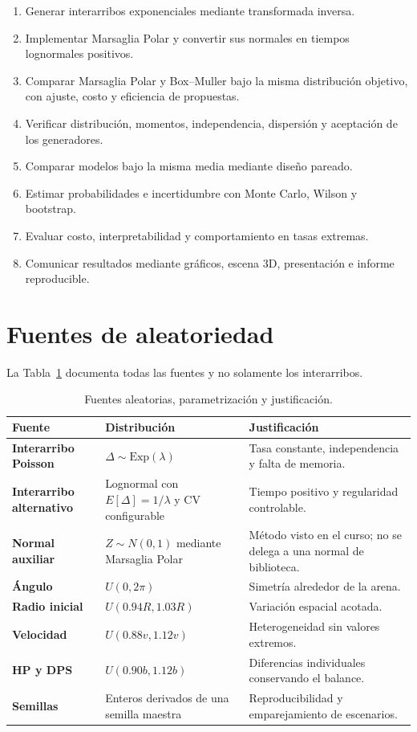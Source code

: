 \documentclass[11pt,a4paper]{article}
\begin{document}
\begin{enumerate}
  \item Generar interarribos exponenciales mediante transformada inversa.
  \item Implementar Marsaglia Polar y convertir sus normales en tiempos
        lognormales positivos.
  \item Comparar Marsaglia Polar y Box--Muller bajo la misma distribución
        objetivo, con ajuste, costo y eficiencia de propuestas.
  \item Verificar distribución, momentos, independencia, dispersión y
        aceptación de los generadores.
  \item Comparar modelos bajo la misma media mediante diseño pareado.
  \item Estimar probabilidades e incertidumbre con Monte Carlo, Wilson y
        bootstrap.
  \item Evaluar costo, interpretabilidad y comportamiento en tasas extremas.
  \item Comunicar resultados mediante gráficos, escena 3D, presentación e
        informe reproducible.
\end{enumerate}

\section{Fuentes de aleatoriedad}

La Tabla~\ref{tab:random-sources} documenta todas las fuentes y no solamente
los interarribos.

\begin{table}[H]
\centering
\small
\caption{Fuentes aleatorias, parametrización y justificación.}
\label{tab:random-sources}
\begin{tabularx}{\textwidth}{>{\bfseries}p{2.9cm}p{4.2cm}X}
\toprule
Fuente & Distribución & Justificación \\
\midrule
Interarribo Poisson & $\Delta\sim\mathrm{Exp}(\lambda)$ &
Tasa constante, independencia y falta de memoria. \\
Interarribo alternativo & Lognormal con $E[\Delta]=1/\lambda$ y CV configurable &
Tiempo positivo y regularidad controlable. \\
Normal auxiliar & $Z\sim N(0,1)$ mediante Marsaglia Polar &
Método visto en el curso; no se delega a una normal de biblioteca. \\
Ángulo & $U(0,2\pi)$ & Simetría alrededor de la arena. \\
Radio inicial & $U(0.94R,1.03R)$ & Variación espacial acotada. \\
Velocidad & $U(0.88v,1.12v)$ & Heterogeneidad sin valores extremos. \\
HP y DPS & $U(0.90b,1.12b)$ & Diferencias individuales conservando el balance. \\
Semillas & Enteros derivados de una semilla maestra &
Reproducibilidad y emparejamiento de escenarios. \\
\bottomrule
\end{tabularx}
\end{table}
\end{document}
